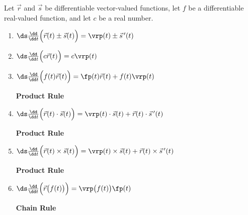 \begin{theorem}\label{thm:vvf_deriv_prop}%
Let $\vec r$ and $\vec s$ be differentiable vector-valued functions, let $f$ be a differentiable real-valued function, and let $c$ be a real number.
\begin{enumerate}
	\item $\ds \frac{\dd}{\dd t}\Bigl(\vec r(t) \pm \vec s(t)\Bigr) = \vrp(t) \pm \vec s\,'(t)$
	\item $\ds \frac{\dd}{\dd t}\Bigl(c\vec r(t)\Bigr) = c\vrp(t)$
	\item \parbox{200pt}{$\ds \frac{\dd}{\dd t}\Bigl(f(t)\vec r(t)\Bigr) = \fp(t)\vec r(t) + f(t)\vrp(t)$} \textbf{Product Rule}
	\item \parbox{200pt}{$\ds \frac{\dd}{\dd t}\Bigl(\vec r(t)\cdot \vec s(t) \Bigr) = \vrp(t)\cdot \vec s(t) + \vec r(t)\cdot \vec s\,'(t)$} \textbf{Product Rule}
	\item\label{crossprodrule} \parbox{200pt}{$\ds \frac{\dd}{\dd t}\Bigl(\vec r(t)\times \vec s(t) \Bigr) = \vrp(t)\times \vec s(t) + \vec r(t)\times \vec s\,'(t)$} \textbf{Product Rule}
%
	\item \parbox{200pt}{$\ds \frac{\dd}{\dd t}\Bigl(\vec r\bigl(f(t)\bigr)\Bigr) = \vrp\bigl(f(t)\bigr)\fp(t)$}  \textbf{Chain Rule}
\end{enumerate}
\end{theorem}

